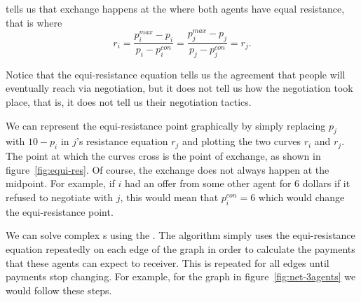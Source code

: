  tells us that exchange happens at the  where both agents have equal resistance, that is where
\begin{equation}
  \label{eq:equi-resistance}
 r_i = \frac{p_{i}^{max} - p_i}{p_i - p_i^{con}} = \frac{p_{j}^{max}
  - p_j}{p_j - p_j^{con}} = r_j. 
\end{equation}

Notice that the equi-resistance equation tells us the agreement that
people will eventually reach via negotiation, but it does not tell us
how the negotiation took place, that is, it does not tell us their
negotiation tactics. 

\begin{SCfigure}
  \begin{minipage}{1.0\linewidth}
  \begin{center}
  \end{center}
  \end{minipage}
  \caption{Resistance of two agents to each possible deal $p$.}
  \label{fig:equi-res}
\end{SCfigure}

We can represent the equi-resistance point graphically by simply
replacing $p_j$ with $10 - p_i$ in $j$'s resistance equation $r_j$ and
plotting the two curves $r_i$ and $r_j$. The point at which the curves
cross is the point of exchange, as shown in figure~\ref{fig:equi-res}.
Of course, the exchange does not always happen at the midpoint. For
example, if $i$ had an offer from some other agent for 6 dollars if it
refused to negotiate with $j$, this would mean that $p_i^{con} = 6$
which would change the equi-resistance point.


We can solve complex s using the . The algorithm simply uses the
equi-resistance equation repeatedly on each edge of the graph in order
to calculate the payments that these agents can expect to receiver.
This is repeated for all edges until payments stop changing. For
example, for the graph in figure~\ref{fig:net-3agents} we would follow
these steps.

